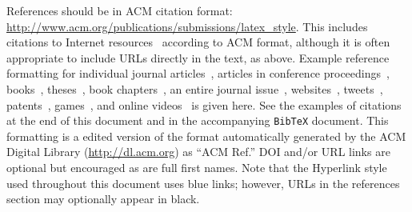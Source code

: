 \documentclass{sigchi}
\begin{document}
%
%
%
%
%
\balance{}



References should be in ACM citation format:
\url{http://www.acm.org/publications/submissions/latex_style}.  This
includes citations to Internet
resources~\cite{CHINOSAUR:venue,cavender:writing,psy:gangnam}
according to ACM format, although it is often appropriate to include
URLs directly in the text, as above. Example reference formatting for
individual journal articles~\cite{ethics}, articles in conference
proceedings~\cite{Klemmer:2002:WSC:503376.503378},
books~\cite{Schwartz:1995:GBF}, theses~\cite{sutherland:sketchpad},
book chapters~\cite{winner:politics}, an entire journal
issue~\cite{kaye:puc},
websites~\cite{acm_categories,cavender:writing},
tweets~\cite{CHINOSAUR:venue}, patents~\cite{heilig:sensorama}, 
games~\cite{supermetroid:snes}, and
online videos~\cite{psy:gangnam} is given here.  See the examples of
citations at the end of this document and in the accompanying
\texttt{BibTeX} document. This formatting is a edited version of the
format automatically generated by the ACM Digital Library
(\url{http://dl.acm.org}) as ``ACM Ref.'' DOI and/or URL links are
optional but encouraged as are full first names. Note that the
Hyperlink style used throughout this document uses blue links;
however, URLs in the references section may optionally appear in
black.

\balance{}



\end{document}
